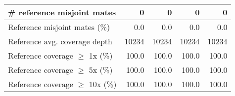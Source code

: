 \documentclass[12pt,a4paper]{article}
\begin{document}
\begin{table}[ht]
\begin{center}
\begin{tabular}{|l*{4}{|r}|}
\# reference misjoint mates & 0 & 0 & 0 & 0 \\ \hline
Reference misjoint mates (\%) & 0.0 & 0.0 & 0.0 & 0.0 \\ \hline
Reference avg. coverage depth & 10234 & 10234 & 10234 & 10234 \\ \hline
Reference coverage $\geq$ 1x (\%) & 100.0 & 100.0 & 100.0 & 100.0 \\ \hline
Reference coverage $\geq$ 5x (\%) & 100.0 & 100.0 & 100.0 & 100.0 \\ \hline
Reference coverage $\geq$ 10x (\%) & 100.0 & 100.0 & 100.0 & 100.0 \\ \hline
\end{tabular}
\end{center}
\end{table}
\end{document}
